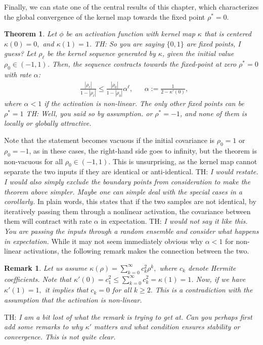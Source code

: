 \documentclass[twoside]{article}
\newtheorem{theorem}{Theorem}
\newtheorem{remark}{Remark}
\theoremstyle{definition}
\newcommand{\thomas}[1]{{\color{blue}TH:  \textit{#1}}}
\begin{document}
Finally, we can state one of the central results of this chapter, which characterizes the global convergence of the kernel map towards the fixed point $\rho^*=0.$

\begin{theorem}\label{thm:global_attract_centered}
Let $\phi$ be an activation function with kernel map $\kappa$ that is centered $\kappa(0)=0,$ and $\kappa(1)=1$. \thomas{So you are saying $\{0,1\}$ are fixed points, I guess?} Let $\rho_\ell$ be the kernel sequence generated by $\kappa$, given the initial value $\rho_0 \in(-1 , 1)$.
Then, the sequence contracts towards the fixed-point at zero $\rho^*=0$ with rate $\alpha$:
    \begin{align}
        &\frac{|\rho_\ell|}{1-|\rho_\ell|} \le \frac{|\rho_0|}{1-|\rho_0|}\alpha^{\ell}, && \alpha := \frac{1}{2-\kappa'(0)},
    \end{align}
 where $\alpha<1$ if the activation is non-linear. The only other fixed points can be $\rho^*=1$ \thomas{Well, you said so by assumption.} or $\rho^*=-1$, and none of them is locally or globally attractive.
\end{theorem}

Note that the statement becomes vacuous if the initial covariance is $\rho_0 = 1$ or $\rho_0 = -1$, as in these cases, the right-hand side goes to infinity, but the theorem is non-vacuous for all $\rho_0\in(-1,1).$ This is unsurprising, as the kernel map cannot separate the two inputs if they are identical or anti-identical. \thomas{I would restate. I would also simply exclude the boundary points from consideration to make the theorem above simpler. Maybe one can simple deal with the special cases in a corollarly.} In plain words, this states that if the two samples are not identical, by iteratively passing them through a nonlinear activation, the covariance between them will contract with rate $\alpha$ in expectation. \thomas{I would not say it like this. You are passing the inputs through a random ensemble and consider what happens in expectation.}  While it may not seem immediately obvious why $\alpha < 1$ for non-linear activations, the following remark makes the connection between the two.

\begin{remark}
    \label{rem:contraction_rate}
    Let us assume $\kappa(\rho)=\sum_{k=0}^\infty c_k^2\rho^k,$ where $c_k$ denote Hermite coefficients. Note that $\kappa'(0) = c_1^2 \le \sum_{k=0}^\infty c_k^2 = \kappa(1)=1$. Now, if we have $\kappa'(1)=1,$ it implies that $c_k=0$ for all $k\ge 2.$ This is a contradiction with the assumption that the activation is non-linear.  
\end{remark}
\thomas{I am a bit lost of what the remark is trying to get at. Can you perhaps first add some remarks to why $\kappa'$ matters and what condition ensures stability or convergence. This is not quite clear.}
\end{document}
